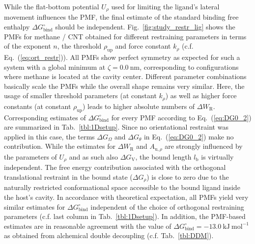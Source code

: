 \documentclass[9pt,lessons,pubversion]{livecoms}
\begin{document}
While the flat-bottom potential $U_\rho$ used for limiting the ligand's lateral movement influences the PMF, the final estimate of the standard binding free enthalpy $\Delta G^\circ_\mathrm{bind}$ should be independent.
Fig.~\ref{fig:study_restr_lig} shows the PMFs for methane / CNT obtained for different restraining parameters in terms of the exponent $n$, the threshold $\rho_\mathrm{up}$ and force constant $k_\rho$ 
(c.f. Eq.~(\ref{eq:ort_restr})). 
All PMFs show perfect symmetry as expected for such a system with a global minimum at $\zeta = 0.0~\mathrm{nm}$, corresponding to configurations where methane is located at the cavity center. 
Different parameter combinations basically scale the PMFs while the overall shape remains very similar.
Here, the usage of smaller threshold parameters (at constant $k_\rho$) as well as higher force constants (at constant $\rho_\mathrm{up}$) leads to higher absolute numbers of $\Delta W_\mathrm{R}$.
Corresponding estimates of $\Delta G^\circ_\mathrm{bind}$ for every PMF according to Eq.~(\ref{eq:DG0_2}) are summarized in Tab.~\ref{tbl:1Dsetup}. 
Since no orientational restraint was applied in this case, the terms $\Delta G_\Omega$ and $\Delta G_\theta$ in Eq.~(\ref{eq:DG0_2}) make no contribution. 
While the estimates for $\Delta W_\mathrm{R}$ and $A_{\mathrm{u},\rho}$ are strongly influenced by the parameters of $U_\rho$ and as such also $\Delta G_\mathrm{V}$, 
the bound length $l_\mathrm{b}$ is virtually independent.
The free energy contribution associated with the orthogonal translational restraint in the bound state ($\Delta G_\rho$) is close to zero due to the naturally restricted conformational space accessible to the bound ligand inside the host's cavity. 
In accordance with theoretical expectation, all PMFs yield very similar estimates for $\Delta G^\circ_\mathrm{bind}$ independent of the choice of orthogonal restraining parameters (c.f. last column in Tab.~\ref{tbl:1Dsetup}).
%
In addition, the PMF-based estimates are in reasonable agreement with the value of $\Delta G^\circ_\mathrm{bind} = -13.0~\mathrm{kJ}~\mathrm{mol}^{-1}$ as obtained from alchemical double decoupling 
(c.f. Tab.~\ref{tbl:DDM}).
\end{document}

